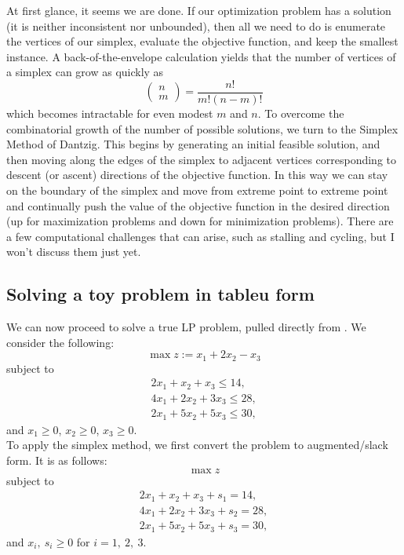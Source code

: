 \documentclass[12pt,english]{article}
\begin{document}
At first glance, it seems we are done.  If our optimization problem has a solution (it is neither inconsistent nor unbounded), then all we need to do is enumerate the vertices of our simplex, evaluate the objective function, and keep the smallest instance.  A back-of-the-envelope calculation yields that the number of vertices of a simplex can grow as quickly as
$$
\left(
\begin{array}{c}
n\\
m
\end{array}
\right)
= 
\frac{n!}{m!(n-m)!}
$$
which becomes intractable for even modest $m$ and $n$.  To overcome the combinatorial growth of the number of possible solutions, we turn to the Simplex Method of Dantzig.   This begins by generating an initial feasible solution, and then moving along the edges of the simplex to adjacent vertices corresponding to descent (or ascent) directions of the objective function.  In this way we can stay on the boundary of the simplex and move from extreme point to extreme point and continually push the value of the objective function in the desired direction (up for maximization problems and down for minimization problems).  There are a few computational challenges that can arise, such as stalling and cycling, but I won't discuss them just yet.\\

\subsection{Solving a toy problem in tableu form}

We can now proceed to solve a true LP problem, pulled directly from \cite{UWW}.  We consider the following:
$$
\max z := x_1 +2 x_2 - x_3
$$
subject to
$$
\begin{array}{c}
2 x_1 + x_2 + x_3 \leq 14, \\
4 x_1 + 2 x_2 + 3 x_3 \leq 28, \\
2 x_1 + 5 x_2 + 5 x_3 \leq 30,
\end{array}
$$
and $x_1 \geq 0$, $x_2 \geq 0$, $x_3 \geq 0$. \\
To apply the simplex method, we first convert the problem to augmented/slack form.  It is as follows:
$$
\max z
$$
subject to 
$$
\begin{array}{c}
2 x_1 + x_2 + x_3 + s_1 = 14, \\
4 x_1 + 2 x_2 + 3 x_3 + s_2 = 28, \\
2 x_1 + 5 x_2 + 5 x_3 + s_3 = 30,
\end{array}
$$
and $x_i, ~ s_i \geq 0$ for $i=1, ~2, ~3.$ \\
\end{document}
